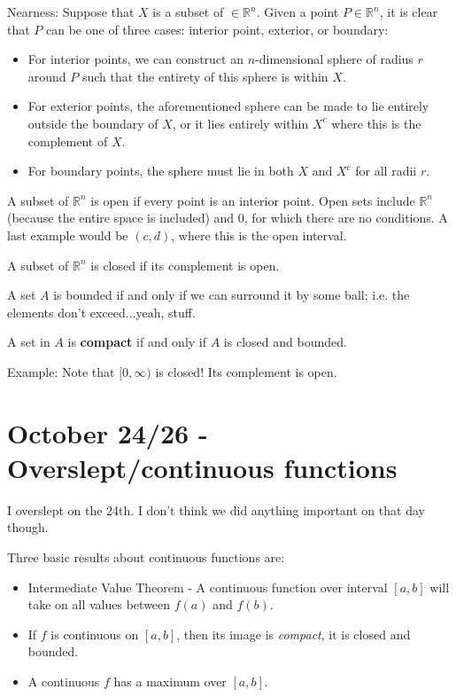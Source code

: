 \documentclass{report}
\begin{document}
Nearness: Suppose that $X$ is a subset of $\in \mathbb{R}^n$. Given a point $P \in \mathbb{R}^n$, it is clear that $P$ can be one of three cases: interior point, exterior, or boundary:

\begin{itemize}
\item For interior points, we can construct an $n$-dimensional sphere of radius $r$ around $P$ such that the entirety of this sphere is within $X$.
\item For exterior points, the aforementioned sphere can be made to lie entirely outside the boundary of $X$, or it lies entirely within $X^c$ where this is the complement of $X$.
\item For boundary points, the sphere must lie in both $X$ and $X^c$ for all radii $r$. 
\end{itemize}

A subset of $\mathbb{R}^n$ is open if every point is an interior point. Open sets include $\mathbb{R}^n$ (because the entire space is included) and $0$, for which there are no conditions. A last example would be $(c,d)$, where this is the open interval. 

A subset of $\mathbb{R}^n$ is closed if its complement is open. 

A set $A$ is bounded if and only if we can surround it by some ball; i.e. the elements don't exceed...yeah, stuff.

A set in $A$ is \textbf{compact} if and only if $A$ is closed and bounded.

Example: Note that $[0,\infty)$ is closed! Its complement is open.

\chapter{October 24/26 - Overslept/continuous functions}

I overslept on the 24th. I don't think we did anything important on that day though.

Three basic results about continuous functions are:

\begin{itemize}
\item Intermediate Value Theorem - A continuous function over interval $[a,b]$ will take on all values between $f(a)$ and $f(b)$.
\item If $f$ is continuous on $[a,b]$, then its image is \emph{compact}, it is closed and bounded.
\item A continuous $f$ has a maximum over $[a,b]$.
\end{itemize}
\end{document}
